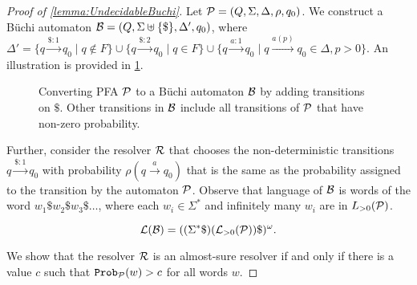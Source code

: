 \begin{proof}[Proof of \cref{lemma:UndecidableBuchi}]
Let $\mathcal{P} = \left( Q,\Sigma,\Delta,\rho,q_0 \right)$. We construct a B\"uchi automaton $\mathcal{B} = (Q,\Sigma\uplus\{\$\},\Delta',q_0)$, where $\Delta' = \{q\xrightarrow{\$:1}q_0\mid q\notin F\}\cup \{q\xrightarrow{\$:2}q_0\mid q\in F\} \cup  \{q\xrightarrow{a:1}q_0\mid q\xrightarrow{a(p)}q_0\in\Delta, p>0\}$. An illustration is provided in \cref{fig:PBAfromPFA}. 
\begin{figure}
    \centering
    \caption{Converting PFA $\mathcal{P}$ to a B\"uchi automaton $\mathcal{B}$ by adding transitions on $\$$. Other transitions in $\mathcal{B}$ include all transitions of $\mathcal{P}$ that have non-zero probability. }
    \label{fig:PBAfromPFA}
\end{figure}
Further, consider the resolver $\mathcal{R}$ that chooses the non-deterministic transitions $q\xrightarrow{\$:1}q_0$ with probability $\rho(q\xrightarrow{a}q_0)$ that is the same as the probability assigned to the transition by the automaton $\mathcal{P}$. Observe that language of $\mathcal{B}$ is words of the word $w_1 \$ w_2 \$ w_3 \$ \dots$, where each $w_i \in \Sigma^{*}$ and infinitely many $w_i$ are in $L_{>0}(\mathcal{P})$.

$$\mathcal{L}(\mathcal{B}) = ( (\Sigma^{*} \$) (\mathcal{L}_{>0} (\mathcal{P}))\$ )^{\omega}.$$

We show that the resolver $\mathcal{R}$ is an almost-sure resolver  if and only if there is a value $c$ such that $\mathtt{Prob}_{\mathcal{P}}(w)>c$ for all words $w$. 

\end{proof}
